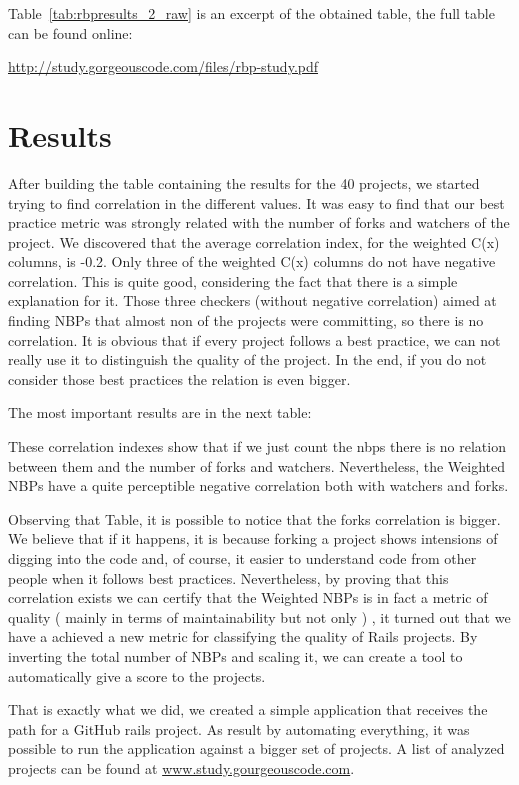 
Table~\ref{tab:rbpresults_2_raw} is an excerpt of the obtained table, the full table can be found online: 

\url{http://study.gorgeouscode.com/files/rbp-study.pdf}




\section{Results}\label{subsec:results}
After building the table containing the results for the 40 projects, 
we started trying to find correlation in the different values. 
It was easy to find that our best practice metric was strongly related with the number of forks and watchers of the project.
We discovered that the average correlation index, for the weighted C(x) columns, is -0.2. 
Only three of the weighted C(x) columns do not have negative correlation. 
This is quite good, considering the fact that there is a simple explanation for it. 
Those three checkers (without negative correlation) aimed at finding NBPs that almost non of the projects were committing, 
so there is no correlation. 
It is obvious that if every project follows a best practice, we can not really use it to distinguish the quality of the project.
In the end, if you do not consider those best practices the relation is even bigger.


The most important results are in the next table:


These correlation indexes show that if we just count the nbps there is no relation between them and the number of forks and watchers. Nevertheless, the Weighted NBPs have a quite perceptible negative correlation both with watchers and forks. 

Observing that Table, it is possible to notice that the forks correlation is bigger. 
We believe that if it happens, it is because forking a project shows intensions of digging into the code and, 
of course, it easier to understand code from other people when it follows best practices.
Nevertheless, by proving that this correlation exists we can certify that the Weighted NBPs 
is in fact a metric of quality ( mainly in terms of maintainability but not only ) 
, it turned out that we have a achieved a new metric for classifying the quality of Rails projects.
By inverting the total number of NBPs and scaling it, we can create a tool to automatically give a score to the projects.

That is exactly what we did, we created a simple application that receives the path for a GitHub rails project. 
As result by automating everything, it was possible to run the application against a bigger set of projects.
A list of analyzed projects can be found at \url{www.study.gourgeouscode.com}.










